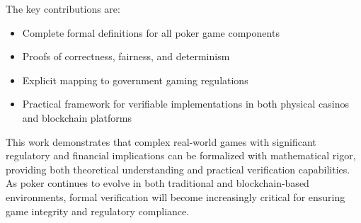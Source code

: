 \documentclass[11pt,a4paper]{article}
\begin{document}
The key contributions are:
\begin{itemize}
    \item Complete formal definitions for all poker game components
    \item Proofs of correctness, fairness, and determinism
    \item Explicit mapping to government gaming regulations
    \item Practical framework for verifiable implementations in both physical casinos and blockchain platforms
\end{itemize}

This work demonstrates that complex real-world games with significant regulatory and financial implications can be formalized with mathematical rigor, providing both theoretical understanding and practical verification capabilities. As poker continues to evolve in both traditional and blockchain-based environments, formal verification will become increasingly critical for ensuring game integrity and regulatory compliance.
\end{document}
